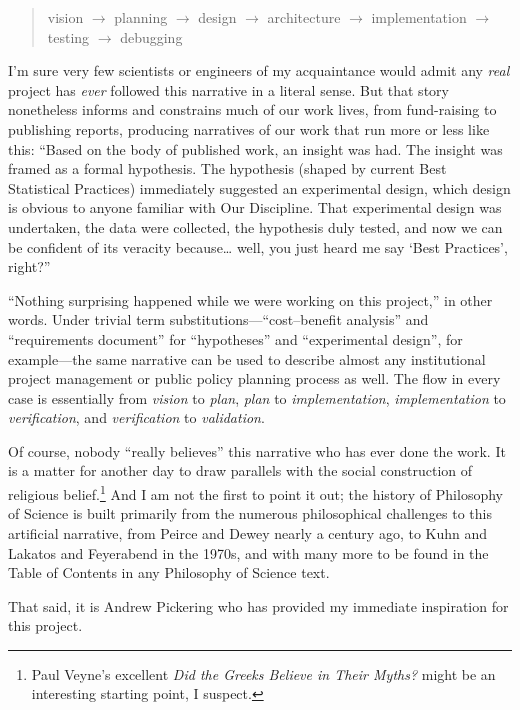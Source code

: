 \begin{quote}
vision $\rightarrow$ planning $\rightarrow$ design $\rightarrow$ architecture $\rightarrow$ implementation $\rightarrow$ testing $\rightarrow$ debugging
\end{quote}

I'm sure very few scientists or engineers of my acquaintance would admit any \emph{real} project has \emph{ever} followed this narrative in a literal sense. But that story nonetheless informs and constrains much of our work lives, from fund-raising to publishing reports, producing narratives of our work that run more or less like this: ``Based on the body of published work, an insight was had. The insight was framed as a formal hypothesis. The hypothesis (shaped by current Best Statistical Practices) immediately suggested an experimental design, which design is obvious to anyone familiar with Our Discipline. That experimental design was undertaken, the data were collected, the hypothesis duly tested, and now we can be confident of its veracity because\ldots{} well, you just heard me say `Best  Practices', right?''

``Nothing surprising happened while we were working on this project,'' in other words. Under trivial term substitutions---``cost--benefit analysis'' and ``requirements document'' for ``hypotheses'' and ``experimental design'', for example---the same narrative can be used to describe almost any institutional project management or public policy planning process as well. The flow in every case is essentially from \emph{vision} to \emph{plan}, \emph{plan} to \emph{implementation}, \emph{implementation} to \emph{verification}, and \emph{verification} to \emph{validation}.

Of course, nobody ``really believes'' this narrative who has ever done the work. It is a matter for another day to draw parallels with the social construction of religious belief.\footnote{Paul Veyne's excellent \emph{Did the Greeks Believe in Their Myths?} \citep{Veyne:1988} might be an interesting starting point, I suspect.} And I am not the first to point it out; the history of Philosophy of Science is built primarily from the numerous philosophical challenges to this artificial narrative, from Peirce and Dewey nearly a century ago, to Kuhn and Lakatos and Feyerabend in the 1970s, and with many more to be found in the Table of Contents in any Philosophy of Science text.

That said, it is Andrew Pickering who has provided my immediate inspiration for this project.

